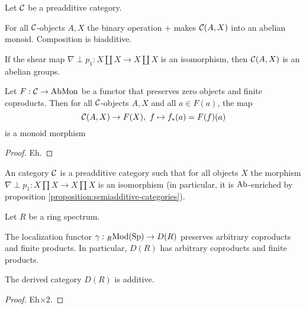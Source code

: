 \begin{proposition}\label{proposition:semiadditive-categories}
Let $\mathcal{C}$ be a preadditive category.
\begin{rmnumerate}
    \item For all $\mathcal{C}$-objects $A,X$ the binary operation $+$ makes $\mathcal{C}(A,X)$ into an abelian monoid. Composition is biadditive.
    \item If the shear map $\nabla\perp p_1:X\coprod X\to X\coprod X$ is an isomorphism, then $\mathcal{C}(A,X)$ is an abelian groups.
    \item Let $F:\mathcal{C}\to\operatorname{AbMon}$ be a functor that preserves zero objects and finite coproducts. Then for all $\mathcal{C}$-objects $A,X$ and all $a\in F(a)$, the map
    \[\mathcal{C}(A,X)\to F(X),\ f\mapsto f_*(a)=F(f)(a)\]
    is a monoid morphism
\end{rmnumerate}
\end{proposition}

\begin{proof}
Eh.

\medskip
{}
\smallskip

\end{proof}

\begin{definition}
An  category $\mathcal{C}$ is a preadditive category such that for all objects $X$ the morphism $\nabla\perp p_1:X\prod X\to X\prod X$ is an isomorphism (in particular, it is ${\normalfont\textup{Ab}}$-enriched by proposition \ref{proposition:semiadditive-categories}).
\end{definition}

\begin{theorem}
Let $R$ be a ring spectrum.
\begin{rmnumerate}
    \item The localization functor $\gamma:{}_{R\!}\operatorname{Mod}({\normalfont\textup{Sp}})\to D(R)$ preserves arbitrary coproducts and finite products. In particular, $D(R)$ has arbitrary coproducts and finite products.
    \item The derived category $D(R)$ is additive.
\end{rmnumerate}
\end{theorem}

\begin{proof}
Eh$\times2$.

\medskip
{}
\smallskip

\end{proof}
